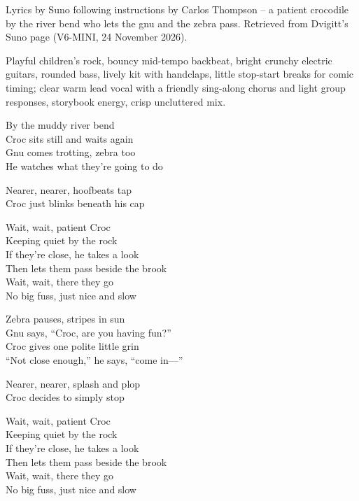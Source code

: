 
\begin{notes}
Lyrics by Suno following instructions by Carlos Thompson -- a patient crocodile by the river bend who lets the gnu and the zebra pass. Retrieved from Dvigitt's Suno page (V6-MINI, 24 November 2026).
\end{notes}
\begin{style}
Playful children’s rock, bouncy mid-tempo backbeat, bright crunchy electric guitars, rounded bass, lively kit with handclaps, little stop-start breaks for comic timing; clear warm lead vocal with a friendly sing-along chorus and light group responses, storybook energy, crisp uncluttered mix.
\end{style}
\begin{lyrics}
By the muddy river bend\\
Croc sits still and waits again\\
Gnu comes trotting, zebra too\\
He watches what they’re going to do

Nearer, nearer, hoofbeats tap\\
Croc just blinks beneath his cap

Wait, wait, patient Croc\\
Keeping quiet by the rock\\
If they’re close, he takes a look\\
Then lets them pass beside the brook\\
Wait, wait, there they go\\
No big fuss, just nice and slow

Zebra pauses, stripes in sun\\
Gnu says, “Croc, are you having fun?”\\
Croc gives one polite little grin\\
“Not close enough,” he says, “come in—”

Nearer, nearer, splash and plop\\
Croc decides to simply stop

Wait, wait, patient Croc\\
Keeping quiet by the rock\\
If they’re close, he takes a look\\
Then lets them pass beside the brook\\
Wait, wait, there they go\\
No big fuss, just nice and slow


\end{lyrics}
